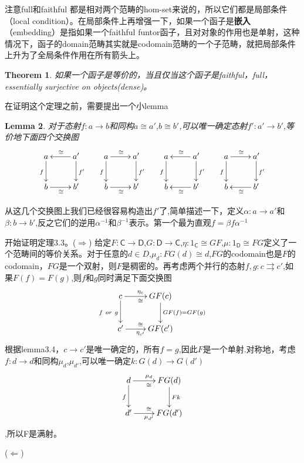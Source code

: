 \documentclass[UTF8,11pt,a4paper]{ctexart}
\newtheorem{theorem}{Theorem}[section]
\newtheorem{lemma}[theorem]{Lemma}
\newcommand{\tbf}{\textbf}
\newcommand*{\cat}[1]{\textsf{#1}\xspace}
\newcommand{\al}{\alpha}
\newcommand{\be}{\beta}
\newcommand*{\xfunc}[4]{{#2}\colon{#3}{#1}{#4}}
\newcommand*{\func}[3]{\xfunc{\to}{#1}{#2}{#3}}
\newcommand*{\pfunc}[3]{\xfunc{\rightrightarrows}{#1}{#2}{#3}}
\newcommand*{\isom}[3]{\xfunc{\cong}{#1}{#2}{#3}}
\begin{document}
注意full和faithful 都是相对两个范畴的hom-set来说的，所以它们都是局部条件（local condition）。在局部条件上再增强一下，如果一个函子是\tbf{嵌入}（embedding）是指如果一个faithful funtor函子，且对对象的作用也是单射，这种情况下，函子的domain范畴其实就是codomain范畴的一个子范畴，就把局部条件上升为了全局条件作用在所有箭头上。

\begin{theorem}
如果一个函子是等价的，当且仅当这个函子是faithful，full，essentially surjective on objects(dense)。
\end{theorem}

在证明这个定理之前，需要提出一个小lemma

\begin{lemma}
对于态射$\func{f}{a}{b}$和同构$a \cong a'$,$b \cong b'$,可以唯一确定态射$\func{f'}{a'}{b'}$,等价地下面四个交换图
\[\xymatrix{
	a\ar[d]_{f} & a'\ar[l]_{\cong}\ar[d]^{f'} &
	a\ar[d]_{f}\ar[r]^{\cong} & a'\ar[d]^{f'} &
	a\ar[d]_{f} & a'\ar[l]_{\cong}\ar[d]^{f'} &
	a\ar[d]_{f}\ar[r]^{\cong} & a'\ar[d]^{f'} \\
	b\ar[r]_{\cong} & b' &
	b\ar[r]_{\cong} & b' &
	b & b'\ar[l]^{\cong} &
	b & b'\ar[l]^{\cong}
	}\]
\end{lemma}
从这几个交换图上我们已经很容易构造出$f'$了,简单描述一下，定义$\func{\al}{a}{a'}$和$\func{\be}{b}{b'}$,反之它们的逆用$\al^{-1}$和$\be^{-1}$表示。第一个最为直观$f=\be f \al^{-1}$

开始证明定理3.3。($\Longrightarrow$) 给定$\func{F}{\cat{C}}{\cat{D}}$,$\func{G}{\cat{D}}{\cat{C}}$,$\isom{\eta}{1_{\cat{C}}}{GF}$,$\isom{\mu}{1_{\cat{D}}}{FG}$定义了一个范畴间的等价关系。对于任意的$d \in D$,$\isom{\mu_d}{FG(d)}{d}$,$FG$的codomain也是$F$的codomain，$FG$是一个双射，则$F$是稠密的。再考虑两个并行的态射$\pfunc{f,g}{c}{c'}$,如果$F(f)=F(g)$,则$f$和$g$同时满足下面交换图
\[\xymatrix{
	c\ar[d]_{f\ or\ g}\ar[r]_{\cong}^{\eta_c} & GF(c)\ar[d]^{GF(f)=GF(g)}\\
	c'\ar[r]_{\eta_{c'}}^{\cong} & GF(c')
	}\]	根据lemma3.4，$c \rightarrow c'$是唯一确定的，所有$f=g$,因此$F$是一个单射.对称地，考虑$\func{f}{d}{d}$和同构$\mu_{d}$,$\mu_{d'}$,可以唯一确定$\func{k}{G(d)}{G(d')}$\[\xymatrix{
	d\ar[d]_{f}\ar[r]_{\cong}^{\mu_d} & FG(d)\ar[d]^{Fk}\\
	d'\ar[r]_{\mu_{d'}}^{\cong} & FG(d')
	}\],所以F是满射。
	
($\Longleftarrow$)		
\end{document}
